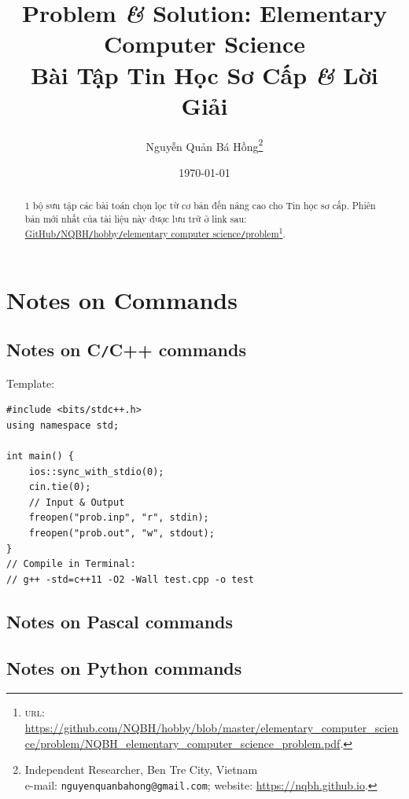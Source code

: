 \documentclass{article}
\title{Problem \textit{\&} Solution: Elementary Computer Science\\Bài Tập Tin Học Sơ Cấp \textit{\&} Lời Giải}
\author{Nguyễn Quản Bá Hồng\footnote{Independent Researcher, Ben Tre City, Vietnam\\e-mail: \texttt{nguyenquanbahong@gmail.com}; website: \url{https://nqbh.github.io}.}}
\date{\today}
\begin{document}
\maketitle
\begin{abstract}
	1 bộ sưu tập các bài toán chọn lọc từ cơ bản đến nâng cao cho Tin học sơ cấp. Phiên bản mới nhất của tài liệu này được lưu trữ ở link sau: \href{https://github.com/NQBH/hobby/blob/master/elementary_computer_science/problem/NQBH_elementary_computer_science_problem.pdf}{GitHub\texttt{/}NQBH\texttt{/}hobby\texttt{/}elementary computer science\texttt{/}problem}\footnote{\textsc{url}: \url{https://github.com/NQBH/hobby/blob/master/elementary_computer_science/problem/NQBH_elementary_computer_science_problem.pdf}.}.
\end{abstract}
\tableofcontents


\section{Notes on Commands}

\subsection{Notes on C\texttt{/}C++ commands}
Template:
\begin{verbatim}
#include <bits/stdc++.h>
using namespace std;

int main() {
    ios::sync_with_stdio(0);
    cin.tie(0);
    // Input & Output
    freopen("prob.inp", "r", stdin);
    freopen("prob.out", "w", stdout);	
}
// Compile in Terminal:
// g++ -std=c++11 -O2 -Wall test.cpp -o test
\end{verbatim}

\subsection{Notes on Pascal commands}

\subsection{Notes on Python commands}
\end{document}
